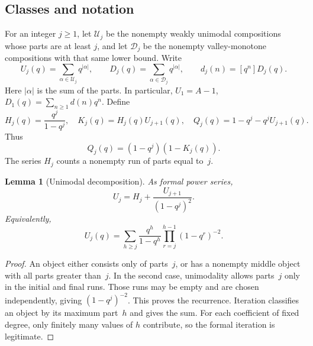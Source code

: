 \documentclass[11pt,a4paper]{article}
\numberwithin{equation}{section}
\newtheorem{lemma}[theorem]{Lemma}
\theoremstyle{definition}\newtheorem{definition}[theorem]{Definition}
\theoremstyle{remark}\newtheorem{remark}[theorem]{Remark}
\newcommand{\coeff}[2]{[#1^{#2}]}
\newcommand{\calD}{\mathcal D}
\newcommand{\calU}{\mathcal U}
\begin{document}
\subsection{Classes and notation}
For an integer \(j\geq1\), let \(\calU_j\) be the nonempty weakly
unimodal compositions whose parts are at least \(j\), and let
\(\calD_j\) be the nonempty valley-monotone compositions with that same
lower bound. Write
\begin{equation}
U_j(q)=\sum_{\alpha\in\calU_j}q^{|\alpha|},\qquad
D_j(q)=\sum_{\alpha\in\calD_j}q^{|\alpha|},\qquad
d_j(n)=\coeff qn D_j(q).
\end{equation}
Here \(|\alpha|\) is the sum of the parts. In particular,
\(U_1=A-1\), \(D_1(q)=\sum_{n\geq1}d(n)q^n\).
Define
\begin{equation}\label{vmb:eq:HKQ}
H_j(q)=\frac{q^j}{1-q^j},\quad
K_j(q)=H_j(q)U_{j+1}(q),\quad
Q_j(q)=1-q^j-q^jU_{j+1}(q).
\end{equation}
Thus
\begin{equation}\label{vmb:eq:QK}
Q_j(q)=(1-q^j)(1-K_j(q)).
\end{equation}
The series \(H_j\) counts a nonempty run of parts equal to~\(j\).

\begin{lemma}[Unimodal decomposition]\label{vmb:lem:U}
As formal power series,
\begin{equation}\label{vmb:eq:Urec}
U_j=H_j+\frac{U_{j+1}}{(1-q^j)^2}.
\end{equation}
Equivalently,
\begin{equation}\label{vmb:eq:Usum}
U_j(q)=\sum_{h\geq j}\frac{q^h}{1-q^h}
                   \prod_{r=j}^{h-1}(1-q^r)^{-2}.
\end{equation}
\end{lemma}
\begin{proof}
An object either consists only of parts~\(j\), or has a nonempty middle
object with all parts greater than~\(j\). In the second case, unimodality
allows parts~\(j\) only in the initial and final runs. Those runs may be
empty and are chosen independently, giving \((1-q^j)^{-2}\).
This proves the recurrence. Iteration classifies an object by its maximum
part~\(h\) and gives the sum. For each coefficient of fixed degree, only
finitely many values of \(h\) contribute, so the formal iteration is
legitimate.
\end{proof}
\end{document}
